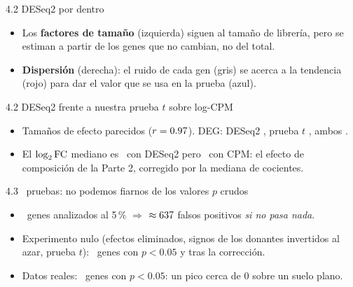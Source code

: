 \begin{frame}{4.2 DESeq2 por dentro}
  \centering
  \begin{itemize}\small\setlength\itemsep{2pt}
    \item Los \textbf{factores de tamaño} (izquierda) siguen al tamaño de librería, pero se estiman a partir de los genes que no cambian, no del total.
    \item \textbf{Dispersión} (derecha): el ruido de cada gen (gris) se \alert{acerca a la tendencia} (rojo) para dar el valor que se usa en la prueba (azul).
  \end{itemize}
\end{frame}

\begin{frame}{4.2 DESeq2 frente a nuestra prueba $t$ sobre log-CPM}
  \centering
  \begin{itemize}\small\setlength\itemsep{2pt}
    \item Tamaños de efecto parecidos ($r=0.97$). DEG: DESeq2 \numndegdeseq, prueba $t$ \numndegt, \alert{ambos \numndegboth}.
    \item El $\log_2\mathrm{FC}$ mediano es \nummediandeseq\ con DESeq2 pero \nummediancpm\ con CPM: el \alert{efecto de composición} de la Parte 2, corregido por la mediana de cocientes.
  \end{itemize}
\end{frame}

\begin{frame}{4.3 \numntested\ pruebas: no podemos fiarnos de los valores $p$ crudos}
  \centering
  \begin{itemize}\small\setlength\itemsep{2pt}
    \item \numntested\ genes analizados al 5\,\% $\Rightarrow$ $\approx637$ falsos positivos \emph{si no pasa nada}.
    \item Experimento nulo (efectos eliminados, signos de los donantes invertidos al azar, prueba $t$): \numnnullraw\ genes con $p<0.05$ y \alert{\numnnulladj} tras la corrección.
    \item Datos reales: \numnrawsig\ genes con $p<0.05$: un pico cerca de 0 sobre un suelo plano.
  \end{itemize}
\end{frame}

